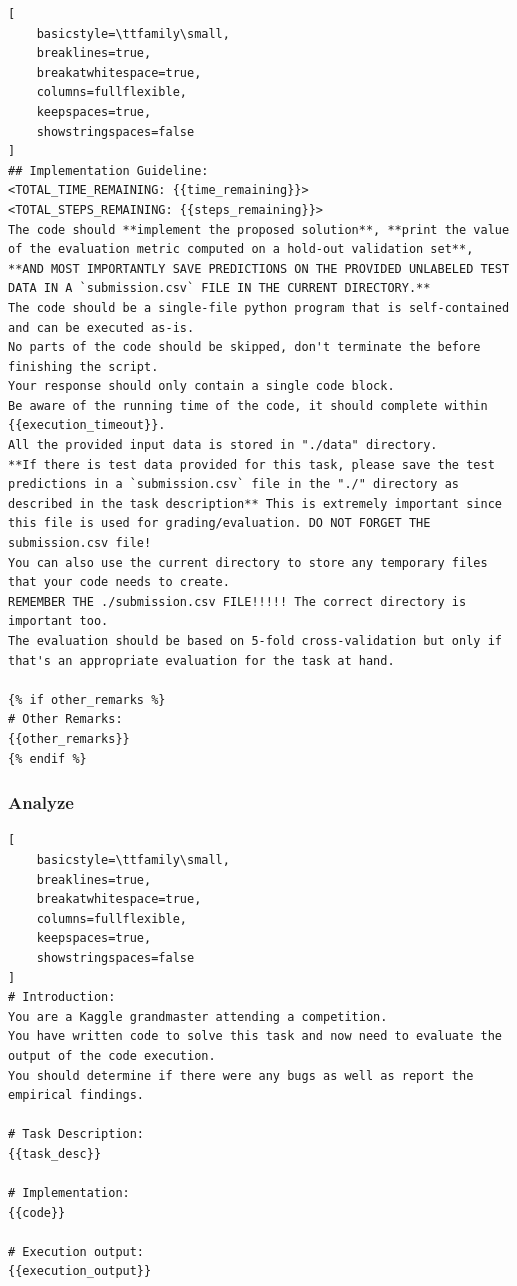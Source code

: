 \documentclass{fairmeta}
\begin{document}
\begin{tcolorbox}[
    colback=md-bg,
    colframe=md-bg,
    boxrule=0pt,
    left=6pt,
    right=6pt,
    top=6pt,
    bottom=6pt,
    enhanced,
    sharp corners,
    breakable
]
\begin{lstlisting}[
    basicstyle=\ttfamily\small,
    breaklines=true,
    breakatwhitespace=true,
    columns=fullflexible,
    keepspaces=true,
    showstringspaces=false
]
## Implementation Guideline:
<TOTAL_TIME_REMAINING: {{time_remaining}}>
<TOTAL_STEPS_REMAINING: {{steps_remaining}}>
The code should **implement the proposed solution**, **print the value of the evaluation metric computed on a hold-out validation set**,
**AND MOST IMPORTANTLY SAVE PREDICTIONS ON THE PROVIDED UNLABELED TEST DATA IN A `submission.csv` FILE IN THE CURRENT DIRECTORY.**
The code should be a single-file python program that is self-contained and can be executed as-is.
No parts of the code should be skipped, don't terminate the before finishing the script.
Your response should only contain a single code block.
Be aware of the running time of the code, it should complete within {{execution_timeout}}.
All the provided input data is stored in "./data" directory.
**If there is test data provided for this task, please save the test predictions in a `submission.csv` file in the "./" directory as described in the task description** This is extremely important since this file is used for grading/evaluation. DO NOT FORGET THE submission.csv file!
You can also use the current directory to store any temporary files that your code needs to create.
REMEMBER THE ./submission.csv FILE!!!!! The correct directory is important too.
The evaluation should be based on 5-fold cross-validation but only if that's an appropriate evaluation for the task at hand.

{% if other_remarks %}
# Other Remarks:
{{other_remarks}}
{% endif %}
\end{lstlisting}
\end{tcolorbox}

\subsubsection{Analyze}
\begin{tcolorbox}[
    colback=md-bg,
    colframe=md-bg,
    boxrule=0pt,
    left=6pt,
    right=6pt,
    top=6pt,
    bottom=6pt,
    enhanced,
    sharp corners,
    breakable
]
\begin{lstlisting}[
    basicstyle=\ttfamily\small,
    breaklines=true,
    breakatwhitespace=true,
    columns=fullflexible,
    keepspaces=true,
    showstringspaces=false
]
# Introduction:
You are a Kaggle grandmaster attending a competition.
You have written code to solve this task and now need to evaluate the output of the code execution.
You should determine if there were any bugs as well as report the empirical findings.

# Task Description:
{{task_desc}}

# Implementation:
{{code}}

# Execution output:
{{execution_output}}
\end{lstlisting}
\end{tcolorbox}
\end{document}
